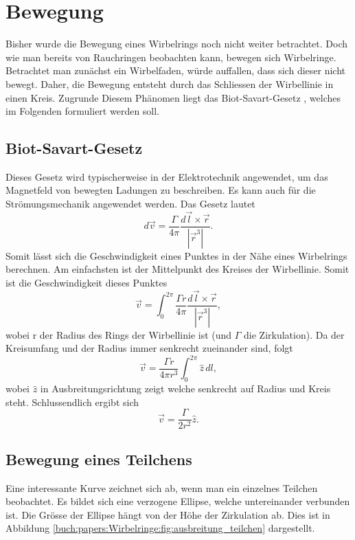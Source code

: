 %
%
%
\section{Bewegung}

Bisher wurde die Bewegung eines Wirbelrings noch nicht weiter betrachtet. 
Doch wie man bereits von Rauchringen beobachten kann, bewegen sich Wirbelringe. 
Betrachtet man zunächst ein Wirbelfaden, würde auffallen, dass sich dieser nicht bewegt. 
Daher, die Bewegung entsteht durch das Schliessen der Wirbellinie in einen Kreis. 
Zugrunde Diesem Phänomen liegt das Biot-Savart-Gesetz \cite{Wirbelringe:FuehrerdurchdieStroemungslehre}, welches im Folgenden formuliert werden soll.

\subsection{Biot-Savart-Gesetz}

Dieses Gesetz wird typischerweise in der Elektrotechnik angewendet, um das Magnetfeld von bewegten Ladungen zu beschreiben. 
Es kann auch für die Strömungsmechanik angewendet werden. 
Das Gesetz lautet 
\[
d \vec{v}
=
\frac{\Gamma}{4\pi}\frac{d \vec{l} \times \vec{r}}{\left\lvert \vec{r}^3\right\rvert }.
\]
Somit lässt sich die Geschwindigkeit eines Punktes in der Nähe eines Wirbelrings berechnen. 
Am einfachsten ist der Mittelpunkt des Kreises der Wirbellinie. 
Somit ist die Geschwindigkeit dieses Punktes
\[
\vec{v}
=
\int_{0}^{2\pi} \frac{\Gamma r}{4\pi}\frac{d \vec{l} \times \vec{r}}{\left\lvert \vec{r}^3\right\rvert },
\]
wobei r der Radius des Rings der Wirbellinie ist (und \(\Gamma\) die Zirkulation). 
Da der Kreisumfang und der Radius immer senkrecht zueinander sind, folgt 
\[
\vec{v}
=
\frac{\Gamma r}{4\pi r^3} \int_{0}^{2\pi} \hat{z}\, dl,
\]
wobei \(\hat{z}\) in Ausbreitungsrichtung zeigt welche senkrecht auf Radius und Kreis steht. 
Schlussendlich ergibt sich
\[
\vec{v}
=
\frac{\Gamma }{2 r^2}\hat{z}.
\]

\subsection{Bewegung eines Teilchens}



Eine interessante Kurve zeichnet sich ab, wenn man ein einzelnes Teilchen beobachtet. 
Es bildet sich eine verzogene Ellipse, welche untereinander verbunden ist. 
Die Grösse der Ellipse hängt von der Höhe der Zirkulation ab. 
Dies ist in Abbildung \ref{buch:papers:Wirbelringe:fig:ausbreitung_teilchen} dargestellt.
